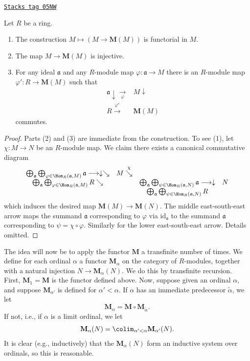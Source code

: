 \begin{lemma}[Construction]
\label{injectives-lemma-construction}
\href{https://stacks.math.columbia.edu/tag/05NW}{\texttt{Stacks tag 05NW}}

Let $R$ be a ring.
\begin{enumerate}
\item The construction $M \mapsto (M \to \mathbf{M}(M))$
is functorial in $M$.
\item The map $M \to \mathbf{M}(M)$ is injective.
\item For any ideal $\mathfrak{a}$ and any $R$-module map
$\varphi : \mathfrak a \to M$ there is an $R$-module map
$\varphi' : R \to \mathbf{M}(M)$ such that
$$
\begin{array}{cc}\mathfrak{a} \downarrow\underset{\varphi}{\longrightarrow} & M \downarrow \\ R \overset{\varphi'}{\longrightarrow} & \mathbf{M}(M)\end{array}
$$
commutes.
\end{enumerate}
\end{lemma}

\begin{proof}
Parts (2) and (3) are immediate from the construction.
To see (1), let $\chi : M \to N$ be an $R$-module map. We claim there exists
a canonical commutative diagram
$$
\begin{array}{cccc}\bigoplus_{\mathfrak a}
\bigoplus_{\varphi \in \Hom_R(\mathfrak a, M)}
\mathfrak{a} \longrightarrow\downarrow\searrow & M \overset{\chi}{\searrow} &  &  \\ \bigoplus_{\mathfrak a}
\bigoplus_{\varphi \in \Hom_R(\mathfrak a, M)}
R \searrow &  & \bigoplus_{\mathfrak a}
\bigoplus_{\psi \in \Hom_R(\mathfrak a, N)}
\mathfrak{a} \longrightarrow\downarrow & N \\  &  & \bigoplus_{\mathfrak a}
\bigoplus_{\psi \in \Hom_R(\mathfrak a, N)}
R & \end{array}
$$
which induces the desired map $\mathbf{M}(M) \to \mathbf{M}(N)$.
The middle east-south-east arrow maps the summand $\mathfrak a$
corresponding to $\varphi$ via $\text{id}_{\mathfrak a}$ to the
summand $\mathfrak a$ corresponding to $\psi = \chi \circ \varphi$.
Similarly for the lower east-south-east arrow. Details omitted.
\end{proof}

The idea will now be to apply the functor $\mathbf{M}$ a transfinite number
of times. We define for each ordinal $\alpha$ a functor $\mathbf{M}_\alpha$
on the category of $R$-modules, together with a natural injection $N \to
\mathbf{M}_\alpha(N)$. We do this by transfinite recursion.
First, $\mathbf{M}_1 = \mathbf{M}$ is the functor defined above.
Now, suppose given an ordinal $\alpha$, and suppose $\mathbf{M}_{\alpha'}$
is defined for $\alpha' < \alpha$. If $\alpha$ has an immediate predecessor
$\widetilde{\alpha}$, we let
$$
\mathbf{M}_\alpha = \mathbf{M} \circ \mathbf{M}_{\widetilde{\alpha}}.
$$
If not, i.e., if $\alpha$ is a limit ordinal, we let
$$
\mathbf{M}_{\alpha}(N) =
\colim_{\alpha' < \alpha} \mathbf{M}_{\alpha'}(N).
$$
It is clear (e.g., inductively) that the $\mathbf{M}_{\alpha}(N)$
form an inductive system over ordinals, so this is reasonable.


